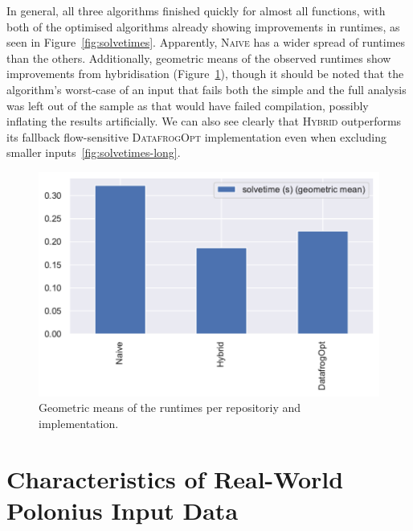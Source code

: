 \documentclass[11pt,a4paper,twoside,openany,draft]{report}
\begin{document}
In general, all three algorithms finished quickly for almost all functions, with
both of the optimised algorithms already showing improvements in runtimes, as
seen in Figure~\ref{fig:solvetimes}. Apparently, \textsc{Naive} has a wider
spread of runtimes than the others. Additionally, geometric means of the
observed runtimes show improvements from hybridisation
(Figure~\ref{fig:solvetimes-gmean-repo}), though it should be noted that the
algorithm's worst-case of an input that fails both the simple and the full
analysis was left out of the sample as that would have failed compilation,
possibly inflating the results artificially. We can also see clearly that
\textsc{Hybrid} outperforms its fallback flow-sensitive \textsc{DatafrogOpt}
implementation even when excluding smaller inputs~\ref{fig:solvetimes-long}.

\begin{figure}
  \includegraphics[width=0.5\linewidth]{Graphs/solvetimes_repo_gmean.pdf}
  \caption[Geometric Means of Runtimes Per Repository]{Geometric means of the
    runtimes per repositoriy and implementation.}\label{fig:solvetimes-gmean-repo}
\end{figure}


\section{Characteristics of Real-World Polonius Input
  Data}\label{sec:inputs:inputs}
\end{document}
